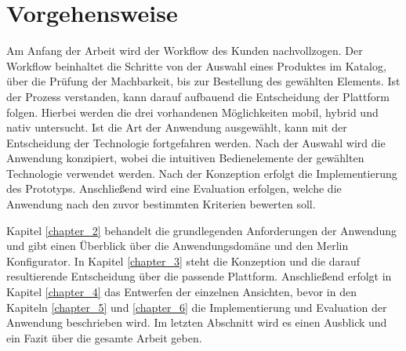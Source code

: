 \section{Vorgehensweise}
Am Anfang der Arbeit wird der Workflow des Kunden nachvollzogen. Der Workflow beinhaltet die Schritte von der Auswahl eines Produktes im Katalog, über die Prüfung der Machbarkeit, bis zur Bestellung des gewählten Elements. Ist der Prozess verstanden, kann darauf aufbauend die Entscheidung der Plattform folgen. Hierbei werden die drei vorhandenen Möglichkeiten mobil, hybrid und nativ untersucht. Ist die Art der Anwendung ausgewählt, kann mit der Entscheidung der Technologie fortgefahren werden. Nach der Auswahl wird die Anwendung konzipiert, wobei die intuitiven Bedienelemente der gewählten Technologie verwendet werden. Nach der Konzeption erfolgt die Implementierung des Prototyps. Anschließend wird eine Evaluation erfolgen, welche die Anwendung nach den zuvor bestimmten Kriterien bewerten soll.

\par
Kapitel \ref{chapter_2} behandelt die grundlegenden Anforderungen der Anwendung und gibt einen Überblick über die Anwendungsdomäne und den Merlin Konfigurator. In Kapitel \ref{chapter_3} steht die Konzeption und die darauf resultierende Entscheidung über die passende Plattform. Anschließend erfolgt in Kapitel \ref{chapter_4} das Entwerfen der einzelnen Ansichten, bevor in den Kapiteln \ref{chapter_5} und \ref{chapter_6} die Implementierung und Evaluation der Anwendung beschrieben wird. Im letzten Abschnitt wird es einen Ausblick und ein Fazit über die gesamte Arbeit geben.








